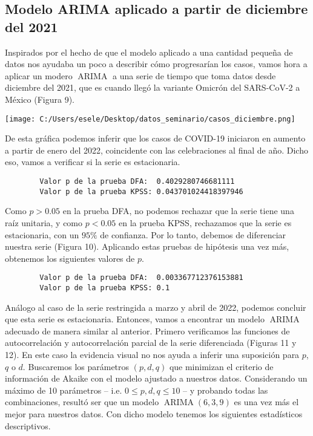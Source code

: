 \documentclass[11pt,letterpaper]{article}
\newcommand{\ARIMA}{\ensuremath{\operatorname{ARIMA}}}
\theoremstyle{definition}
\theoremstyle{theorem}
\theoremstyle{remark}
\begin{document}
	\subsection{Modelo ARIMA aplicado a partir de diciembre del 2021}
	\noindent Inspirados por el hecho de que el modelo aplicado a una cantidad pequeña de datos nos ayudaba un poco a describir cómo progresarían los casos, vamos hora a aplicar un modero \(\ARIMA\) a una serie de tiempo que toma datos desde diciembre del 2021, que es cuando llegó la variante Omicrón del SARS-CoV-2 a México (Figura 9).
	\begin{center}
		\texttt{[image: C:/Users/esele/Desktop/datos\_seminario/casos\_diciembre.png]}
	\end{center}
	\par De esta gráfica podemos inferir que los casos de COVID-19 iniciaron en aumento a partir de enero del 2022, coincidente con las celebraciones al final de año. Dicho eso, vamos a verificar si la serie es estacionaria.
	\begin{verbatim}
		Valor p de la prueba DFA:  0.4029280746681111 
		Valor p de la prueba KPSS: 0.043701024418397946\end{verbatim}
	Como \(p>0.05\) en la prueba DFA, no podemos rechazar que la serie tiene una raíz unitaria, y como \(p<0.05\) en la prueba KPSS, rechazamos que la serie es estacionaria, con un \(95\%\) de confianza. Por lo tanto, debemos de diferenciar nuestra serie (Figura 10). Aplicando estas pruebas de hipótesis una vez más, obtenemos los siguientes valores de \(p\).
	\begin{verbatim}
		Valor p de la prueba DFA:  0.003367712376153881 
		Valor p de la prueba KPSS: 0.1\end{verbatim}
	\par Análogo al caso de la serie restringida a marzo y abril de 2022, podemos concluir que esta serie es estacionaria. Entonces, vamos a encontrar un modelo \(\ARIMA\) adecuado de manera similar al anterior. Primero verificamos las funciones de autocorrelación y autocorrelación parcial de la serie diferenciada (Figuras 11 y 12). En este caso la evidencia visual no nos ayuda a inferir una suposición para \(p\), \(q\) o \(d\). Buscaremos los parámetros \((p,d,q)\) que minimizan el criterio de información de Akaike con el modelo ajustado a nuestros datos. Considerando un máximo de 10 parámetros -- i.e. \(0\leq p,d,q\leq10\) -- y probando todas las combinaciones, resultó ser que un modelo \(\ARIMA(6,3,9)\) es una vez más el mejor para nuestros datos. Con dicho modelo tenemos los siguientes estadísticos descriptivos.
\end{document}
